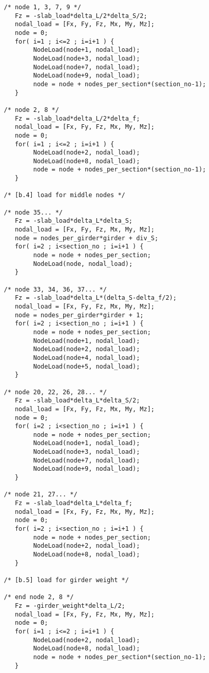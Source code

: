 \begin{footnotesize}
\begin{verbatim}
   /* node 1, 3, 7, 9 */
      Fz = -slab_load*delta_L/2*delta_S/2;
      nodal_load = [Fx, Fy, Fz, Mx, My, Mz];
      node = 0;
      for( i=1 ; i<=2 ; i=i+1 ) {
           NodeLoad(node+1, nodal_load);
           NodeLoad(node+3, nodal_load);
           NodeLoad(node+7, nodal_load);
           NodeLoad(node+9, nodal_load);
           node = node + nodes_per_section*(section_no-1);
      }

   /* node 2, 8 */
      Fz = -slab_load*delta_L/2*delta_f;
      nodal_load = [Fx, Fy, Fz, Mx, My, Mz];
      node = 0;
      for( i=1 ; i<=2 ; i=i+1 ) {
           NodeLoad(node+2, nodal_load);
           NodeLoad(node+8, nodal_load);
           node = node + nodes_per_section*(section_no-1);
      }

   /* [b.4] load for middle nodes */

   /* node 35... */
      Fz = -slab_load*delta_L*delta_S;
      nodal_load = [Fx, Fy, Fz, Mx, My, Mz];
      node = nodes_per_girder*girder + div_S;
      for( i=2 ; i<section_no ; i=i+1 ) {
           node = node + nodes_per_section;
           NodeLoad(node, nodal_load);
      }

   /* node 33, 34, 36, 37... */
      Fz = -slab_load*delta_L*(delta_S-delta_f/2);
      nodal_load = [Fx, Fy, Fz, Mx, My, Mz];
      node = nodes_per_girder*girder + 1;
      for( i=2 ; i<section_no ; i=i+1 ) {
           node = node + nodes_per_section;
           NodeLoad(node+1, nodal_load);
           NodeLoad(node+2, nodal_load);
           NodeLoad(node+4, nodal_load);
           NodeLoad(node+5, nodal_load);
      }

   /* node 20, 22, 26, 28... */
      Fz = -slab_load*delta_L*delta_S/2;
      nodal_load = [Fx, Fy, Fz, Mx, My, Mz];
      node = 0;
      for( i=2 ; i<section_no ; i=i+1 ) {
           node = node + nodes_per_section;
           NodeLoad(node+1, nodal_load);
           NodeLoad(node+3, nodal_load);
           NodeLoad(node+7, nodal_load);
           NodeLoad(node+9, nodal_load);
      }

   /* node 21, 27... */
      Fz = -slab_load*delta_L*delta_f;
      nodal_load = [Fx, Fy, Fz, Mx, My, Mz];
      node = 0;
      for( i=2 ; i<section_no ; i=i+1 ) {
           node = node + nodes_per_section;
           NodeLoad(node+2, nodal_load);
           NodeLoad(node+8, nodal_load);
      }

   /* [b.5] load for girder weight */

   /* end node 2, 8 */
      Fz = -girder_weight*delta_L/2;
      nodal_load = [Fx, Fy, Fz, Mx, My, Mz];
      node = 0;
      for( i=1 ; i<=2 ; i=i+1 ) {
           NodeLoad(node+2, nodal_load);
           NodeLoad(node+8, nodal_load);
           node = node + nodes_per_section*(section_no-1);
      }


\end{verbatim}
\end{footnotesize}
